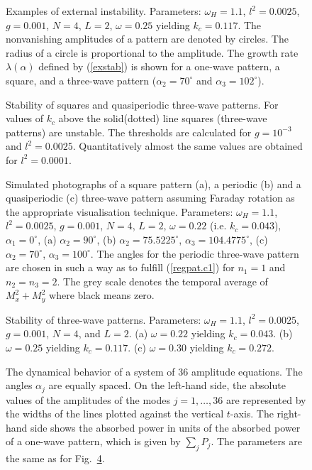 \begin{figure}
\caption[lambda]{\protect\label{f.lambda}
Examples of external instability. Parameters: $\omega_H=1.1$, 
$l^2=0.0025$, $g=0.001$, $N=4$, $L=2$, $\omega=0.25$ yielding
$k_c=0.117$. The nonvanishing amplitudes of a pattern are denoted by
circles. The radius of a circle is proportional to the amplitude. The
growth rate $\lambda(\alpha)$ defined by (\ref{exstab}) is shown for
a one-wave pattern, a square, and a three-wave pattern
($\alpha_2=70^\circ$ and $\alpha_3=102^\circ$).  }
\end{figure}

\begin{figure}
\caption[Stability of squares and quasiperiodic three-wave patterns]{
\protect\label{f.kcc}
Stability of squares and quasiperiodic three-wave patterns. For
values of $k_c$ above the solid(dotted) line squares (three-wave
patterns) are unstable. The thresholds are calculated for $g=10^{-3}$
and $l^2=0.0025$.  Quantitatively almost the same values are obtained
for $l^2=0.0001$.}
\end{figure}

\begin{figure}
\caption[Patterns]{\protect\label{f.pat}
Simulated photographs of a square pattern (a), a periodic (b) and a
quasiperiodic (c) three-wave pattern assuming Faraday rotation as the
appropriate visualisation technique. Parameters: $\omega_H=1.1$, 
$l^2=0.0025$, $g=0.001$, $N=4$, $L=2$, $\omega=0.22$ (i.e.
$k_c=0.043$), $\alpha_1=0^\circ$, (a) $\alpha_2=90^\circ$, (b)
$\alpha_2=75.5225^\circ$, $\alpha_3=104.4775^\circ$, (c)
$\alpha_2=70^\circ$, $\alpha_3=100^\circ$. The angles for the
periodic three-wave pattern are chosen in such a way as to fulfill
(\ref{regpat.c1}) for $n_1=1$ and $n_2=n_3=2$. The grey scale denotes
the temporal average of $M_x^2+M_y^2$ where black means zero.  }
\end{figure}

\begin{figure}
\caption[three wave stability]{\protect\label{f.stab}
Stability of three-wave patterns. Parameters: $\omega_H=1.1$, 
$l^2=0.0025$, $g=0.001$, $N=4$, and $L=2$. (a) $\omega=0.22$ yielding
$k_c=0.043$.  (b) $\omega=0.25$ yielding $k_c=0.117$.  (c)
$\omega=0.30$ yielding $k_c=0.272$. }
\end{figure}

\begin{figure}
\caption[Dynamics without noise]{\protect\label{f.dyn}
The dynamical behavior of a system of 36 amplitude equations. The
angles $\alpha_j$ are equally spaced. On the left-hand side, the
absolute values of the amplitudes of the modes $j=1,\ldots,36$ are
represented by the widths of the lines plotted against the vertical
$t$-axis. The right-hand side shows the absorbed power in units of
the absorbed power of a one-wave pattern, which is given by 
$\sum_jP_j$. The parameters are the same as for Fig.~\ref{f.stab}.  }
\end{figure}

